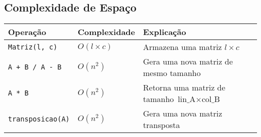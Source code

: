 \documentclass{article}
\begin{document}
\subsection{Complexidade de Espaço}
\begin{tabular}{|l|l|p{8cm}|}
\hline
\textbf{Operação} & \textbf{Complexidade} & \textbf{Explicação} \\
\hline
\texttt{Matriz(l, c)} & $O(l \times c)$ & Armazena uma matriz $l \times c$ \\
\hline
\texttt{A + B / A - B} & $O(n^2)$ & Gera uma nova matriz de mesmo tamanho \\
\hline
\texttt{A * B} & $O(n^2)$ & Retorna uma matriz de tamanho $\text{lin\_A} \times \text{col\_B}$ \\
\hline
\texttt{transposicao(A)} & $O(n^2)$ & Gera uma nova matriz transposta \\
\hline
\end{tabular}
\end{document}
